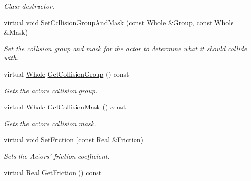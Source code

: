 \begin{DoxyCompactItemize}
\begin{DoxyCompactList}\small\item\em Class destructor. \item\end{DoxyCompactList}\item 
virtual void \hyperlink{classphys_1_1ActorBasePhysicsSettings_a992771e73cd1f98628618cf75938a5ef}{SetCollisionGroupAndMask} (const \hyperlink{namespacephys_a460f6bc24c8dd347b05e0366ae34f34a}{Whole} \&Group, const \hyperlink{namespacephys_a460f6bc24c8dd347b05e0366ae34f34a}{Whole} \&Mask)
\begin{DoxyCompactList}\small\item\em Set the collision group and mask for the actor to determine what it should collide with. \item\end{DoxyCompactList}\item 
virtual \hyperlink{namespacephys_a460f6bc24c8dd347b05e0366ae34f34a}{Whole} \hyperlink{classphys_1_1ActorBasePhysicsSettings_a6090c93f35beea7c82550076a17aef24}{GetCollisionGroup} () const 
\begin{DoxyCompactList}\small\item\em Gets the actors collision group. \item\end{DoxyCompactList}\item 
virtual \hyperlink{namespacephys_a460f6bc24c8dd347b05e0366ae34f34a}{Whole} \hyperlink{classphys_1_1ActorBasePhysicsSettings_a8a3a7ca225dd9697495bcc7d51b0942a}{GetCollisionMask} () const 
\begin{DoxyCompactList}\small\item\em Gets the actors collision mask. \item\end{DoxyCompactList}\item 
virtual void \hyperlink{classphys_1_1ActorBasePhysicsSettings_ad76ddc51fb8514c1cffa9d5f222b580c}{SetFriction} (const \hyperlink{namespacephys_af7eb897198d265b8e868f45240230d5f}{Real} \&Friction)
\begin{DoxyCompactList}\small\item\em Sets the Actors' friction coefficient. \item\end{DoxyCompactList}\item 
virtual \hyperlink{namespacephys_af7eb897198d265b8e868f45240230d5f}{Real} \hyperlink{classphys_1_1ActorBasePhysicsSettings_ad38f4ccdbc0ecf997bb9745c23961f6d}{GetFriction} () const 

\end{DoxyCompactItemize}

